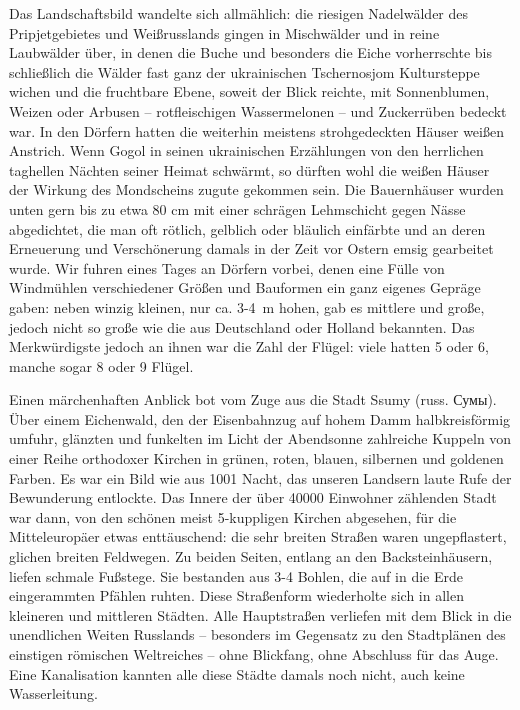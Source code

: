 Das Landschaftsbild wandelte sich allmählich: die riesigen Nadelwälder des Pripjetgebietes und Weißrusslands gingen in Mischwälder und in reine Laubwälder über, in denen die Buche und besonders die Eiche vorherrschte bis schließlich die Wälder fast ganz der ukrainischen Tschernosjom Kultursteppe wichen und die fruchtbare Ebene, soweit der Blick reichte, mit Sonnenblumen, Weizen oder Arbusen -- rotfleischigen Wassermelonen -- und Zuckerrüben bedeckt war. In den Dörfern hatten die weiterhin meistens strohgedeckten Häuser weißen Anstrich. Wenn Gogol in seinen ukrainischen Erzählungen von den herrlichen taghellen Nächten seiner Heimat schwärmt, so dürften wohl die weißen Häuser der Wirkung des Mondscheins zugute gekommen sein. Die Bauernhäuser wurden unten gern bis zu etwa 80 cm mit einer schrägen Lehmschicht gegen Nässe abgedichtet, die man oft rötlich, gelblich oder bläulich einfärbte und an deren Erneuerung und Verschönerung damals in der Zeit vor Ostern emsig gearbeitet wurde. Wir fuhren eines Tages an Dörfern vorbei, denen eine Fülle von Windmühlen verschiedener Größen und Bauformen ein ganz eigenes Gepräge gaben: neben winzig kleinen, nur ca. 3-4~m hohen, gab es mittlere und große, jedoch nicht so große wie die aus Deutschland oder Holland bekannten. Das Merkwürdigste jedoch an ihnen war die Zahl der Flügel: viele hatten 5 oder 6, manche sogar 8 oder 9 Flügel.

Einen märchenhaften Anblick bot vom Zuge aus die Stadt Ssumy (russ. Сумы). Über einem Eichenwald, den der Eisenbahnzug auf hohem Damm halbkreisförmig umfuhr, glänzten und funkelten im Licht der Abendsonne zahlreiche Kuppeln von einer Reihe orthodoxer Kirchen in grünen, roten, blauen, silbernen und goldenen Farben. Es war ein Bild wie aus 1001 Nacht, das unseren Landsern laute Rufe der Bewunderung entlockte. Das Innere der über \num{40000} Einwohner zählenden Stadt war dann, von den schönen meist 5-kuppligen Kirchen abgesehen, für die Mitteleuropäer etwas enttäuschend: die sehr breiten Straßen waren ungepflastert, glichen breiten Feldwegen. Zu beiden Seiten, entlang an den Backsteinhäusern, liefen schmale Fußstege. Sie bestanden aus 3-4 Bohlen, die auf in die Erde eingerammten Pfählen ruhten. Diese Straßenform wiederholte sich in allen kleineren und mittleren Städten. Alle Hauptstraßen verliefen mit dem Blick in die unendlichen Weiten Russlands -- besonders im Gegensatz zu den Stadtplänen des einstigen römischen Weltreiches -- ohne Blickfang, ohne Abschluss für das Auge. Eine Kanalisation kannten alle diese Städte damals noch nicht, auch keine Wasserleitung.

